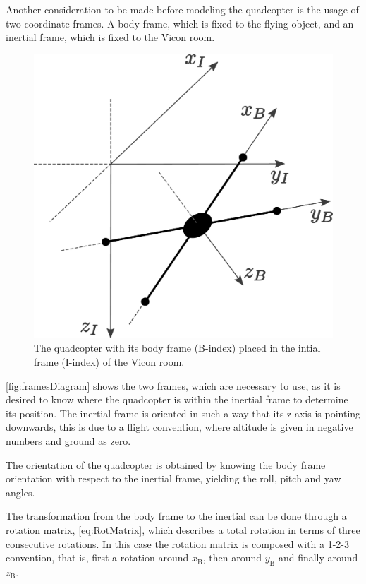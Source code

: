 Another consideration to be made before modeling the quadcopter is the usage of two coordinate frames. A body frame, which is fixed to the flying object, and an inertial frame, which is fixed to the Vicon room. 
%
\begin{figure}[H]
    \centering
    \includegraphics[scale=0.25]{figures/framesDiagram}
    \caption{The quadcopter with its body frame (B-index) placed in the intial frame (I-index) of the Vicon room. }
    \label{fig:framesDiagram}
\end{figure}

\autoref{fig:framesDiagram} shows the two frames, which are necessary to use, as it is desired to know where the quadcopter is within the inertial frame to determine its position. The inertial frame is oriented in such a way that its z-axis is pointing downwards, this is due to a flight convention, where altitude is given in negative numbers and ground as zero. 

The orientation of the quadcopter is obtained by knowing the body frame orientation with respect to the inertial frame, yielding the roll, pitch and yaw angles. 

The transformation from the body frame to the inertial can be done through a rotation matrix, \autoref{eq:RotMatrix}, which describes a total rotation in terms of three consecutive rotations. In this case the rotation matrix is composed with a 1-2-3 convention, that is, first a rotation around $x_{\mathrm{B}}$, then around $y_{\mathrm{B}}$ and finally around $z_{\mathrm{B}}$.

